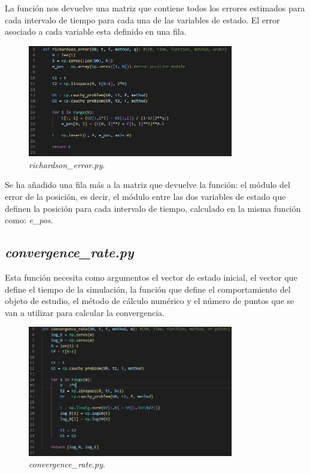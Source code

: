 \documentclass[12pt,a4paper]{article}
\begin{document}
La función nos devuelve una matriz que contiene todos los errores estimados para cada intervalo de tiempo para cada una de las variables de estado. El error asociado a cada variable esta definido en una fila.
\begin{figure}[H] 
	\centering
	\includegraphics[width=0.8\textwidth]{FIGURES/Codigo/richardson_error.jpg}
	\caption{\textit{richardson\_error.py}.}
\end{figure}
Se ha añadido una fila más a la matriz que devuelve la función: el módulo del error de la posición, es decir, el módulo entre las dos variables de estado que definen la posición para cada intervalo de tiempo, calculado en la misma función como: \textit{e\_pos}.

\subsection{\textit{convergence\_rate.py}}
Esta función necesita como argumentos el vector de estado inicial, el vector que define el tiempo de la simulación, la función que define el comportamiento del objeto de estudio, el método de cálculo numérico y el número de puntos que se van a utilizar para calcular la convergencia.
\begin{figure}[H] 
	\centering
	\includegraphics[width=0.8\textwidth]{FIGURES/Codigo/convergence_rate.jpg}
	\caption{\textit{convergence\_rate.py}.}
\end{figure}
\end{document}
